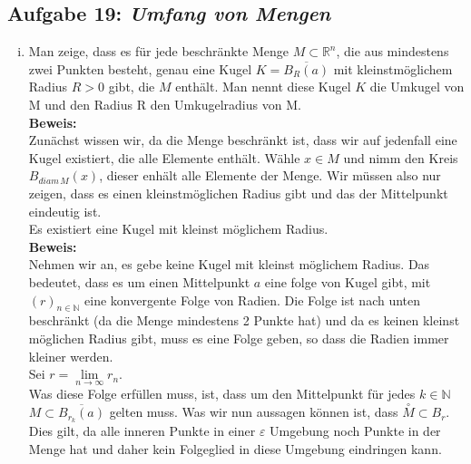 \documentclass[11pt,a4paper,ngerman]{article}
\begin{document}
\subsection*{Aufgabe 19: \mdseries\itshape Umfang von Mengen}
	\begin{enumerate}[(i)]
		\item Man zeige, dass es für jede beschränkte Menge $M \subset \mathbb{R}^n$, die aus mindestens zwei Punkten besteht,
		genau eine Kugel $K = \overline{B_R(a)}$ mit kleinstmöglichem Radius $R > 0$ gibt, die $M$ enthält. Man nennt diese Kugel 
		$K$ die Umkugel von M und den Radius R den Umkugelradius von M.\\
		\textbf{Beweis:}\\
            Zunächst wissen wir, da die Menge beschränkt ist, dass wir auf jedenfall eine Kugel
            existiert, die alle Elemente enthält. Wähle $x \in M$ 
            und nimm den Kreis $B_{diam \, M}(x)$, dieser enhält alle Elemente der Menge.
            Wir müssen also nur zeigen, dass es einen kleinstmöglichen
            Radius gibt und das der Mittelpunkt eindeutig ist.\\

            Es existiert eine Kugel mit kleinst möglichem Radius.\\
            \textbf{Beweis:}\\
                Nehmen wir an, es gebe keine Kugel mit kleinst möglichem Radius.
                Das bedeutet, dass es um einen Mittelpunkt $a$ eine folge von Kugel
                gibt, mit $(r)_{n\in \mathbb{N}}$ eine konvergente Folge von Radien.
                Die Folge ist nach unten beschränkt (da die Menge mindestens 2 Punkte hat)
                und da es keinen kleinst möglichen Radius gibt, muss es eine 
                Folge geben, so dass die Radien immer kleiner werden.\\
                Sei $r = \underset{n \rightarrow \infty}{\lim} r_n$.\\

                Was diese Folge erfüllen muss, ist, dass um den Mittelpunkt
                für jedes $k \in \mathbb{N}$ $M \subset \overline{B_{r_k}(a)}$ gelten
                muss. Was wir nun aussagen können ist, dass $\overset{\circ}{M} \subset B_{r}$.
                Dies gilt, da alle inneren Punkte in einer $\varepsilon$ Umgebung noch Punkte
                in der Menge hat und daher kein Folgeglied in diese Umgebung eindringen kann.\\


\end{enumerate}
\end{document}
